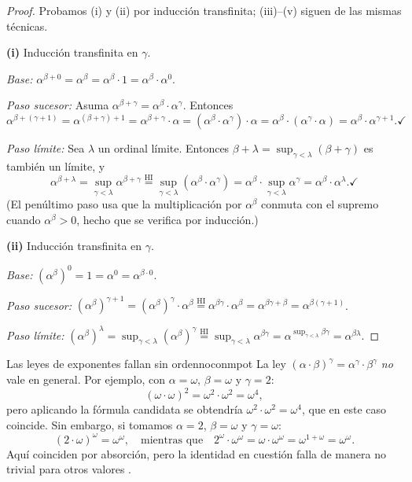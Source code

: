 \begin{proof}
Probamos (i) y (ii) por inducción transfinita; (iii)--(v) siguen de las mismas técnicas.

\textbf{(i)} Inducción transfinita en $\gamma$.

\textit{Base:} $\alpha^{\beta+0} = \alpha^\beta = \alpha^\beta \cdot 1 = \alpha^\beta \cdot \alpha^0$. \checkmark

\textit{Paso sucesor:} Asuma $\alpha^{\beta+\gamma} = \alpha^\beta \cdot \alpha^\gamma$. Entonces
\[
  \alpha^{\beta+(\gamma+1)} = \alpha^{(\beta+\gamma)+1} = \alpha^{\beta+\gamma} \cdot \alpha
  = (\alpha^\beta \cdot \alpha^\gamma) \cdot \alpha = \alpha^\beta \cdot (\alpha^\gamma \cdot \alpha)
  = \alpha^\beta \cdot \alpha^{\gamma+1}. \checkmark
\]

\textit{Paso límite:} Sea $\lambda$ un ordinal límite. Entonces $\beta + \lambda = \sup_{\gamma<\lambda}(\beta+\gamma)$ es también un límite, y
\[
  \alpha^{\beta+\lambda}
  = \sup_{\gamma < \lambda} \alpha^{\beta+\gamma}
  \stackrel{\text{HI}}{=} \sup_{\gamma < \lambda} (\alpha^\beta \cdot \alpha^\gamma)
  = \alpha^\beta \cdot \sup_{\gamma < \lambda} \alpha^\gamma
  = \alpha^\beta \cdot \alpha^\lambda. \checkmark
\]
(El penúltimo paso usa que la multiplicación por $\alpha^\beta$ conmuta con el supremo cuando $\alpha^\beta > 0$, hecho que se verifica por inducción.)

\textbf{(ii)} Inducción transfinita en $\gamma$.

\textit{Base:} $(\alpha^\beta)^0 = 1 = \alpha^0 = \alpha^{\beta \cdot 0}$. \checkmark

\textit{Paso sucesor:} $(\alpha^\beta)^{\gamma+1} = (\alpha^\beta)^\gamma \cdot \alpha^\beta
\stackrel{\text{HI}}{=} \alpha^{\beta\gamma} \cdot \alpha^\beta = \alpha^{\beta\gamma + \beta}
= \alpha^{\beta(\gamma+1)}$. \checkmark

\textit{Paso límite:} $(\alpha^\beta)^\lambda = \sup_{\gamma<\lambda}(\alpha^\beta)^\gamma
\stackrel{\text{HI}}{=} \sup_{\gamma<\lambda} \alpha^{\beta\gamma}
= \alpha^{\sup_{\gamma<\lambda}\beta\gamma} = \alpha^{\beta\lambda}$. \checkmark
\end{proof}

\begin{observacion}{Las leyes de exponentes fallan sin orden}{noconmpot}
La ley $(\alpha \cdot \beta)^\gamma = \alpha^\gamma \cdot \beta^\gamma$ \emph{no} vale en general. Por ejemplo, con $\alpha = \omega$, $\beta = \omega$ y $\gamma = 2$:
\[
  (\omega \cdot \omega)^2 = \omega^2 \cdot \omega^2 = \omega^4,
\]
pero aplicando la fórmula candidata se obtendría $\omega^2 \cdot \omega^2 = \omega^4$, que en este caso coincide. Sin embargo, si tomamos $\alpha = 2$, $\beta = \omega$ y $\gamma = \omega$:
\[
  (2 \cdot \omega)^\omega = \omega^\omega,
  \quad\text{mientras que}\quad
  2^\omega \cdot \omega^\omega = \omega \cdot \omega^\omega = \omega^{1+\omega} = \omega^\omega.
\]
Aquí coinciden por absorción, pero la identidad en cuestión falla de manera no trivial para otros valores \cite{sierpinski1958}.
\end{observacion}

